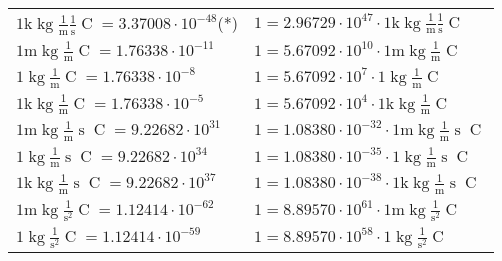 \begin{center}
\begin{longtable}{l l}
{\color{gray}$1 \bm{\mathrm{ k}}\operatorname{kg}\frac1{\operatorname{m}}\frac1{\operatorname{s}}{\operatorname{C}}{} = 3.37008\cdot10^{-48} $}\quad(*) & {\color{gray}$ 1 = 2.96729\cdot10^{47} \cdot 1 \bm{\mathrm{ k}}\operatorname{kg}\frac1{\operatorname{m}}\frac1{\operatorname{s}}{\operatorname{C}}{}$}  \\
{\color{gray}$1 \bm{\mathrm{ m}}\operatorname{kg}\frac1{\operatorname{m}}{}{\operatorname{C}}{} = 1.76338\cdot10^{-11} $}   & {\color{gray}$ 1 = 5.67092\cdot10^{10} \cdot 1 \bm{\mathrm{ m}}\operatorname{kg}\frac1{\operatorname{m}}{}{\operatorname{C}}{}$}  \\
{\color{black}$1 \bm{\mathrm{ }}\operatorname{kg}\frac1{\operatorname{m}}{}{\operatorname{C}}{} = 1.76338\cdot10^{-8} $}   & {\color{black}$ 1 = 5.67092\cdot10^{7} \cdot 1 \bm{\mathrm{ }}\operatorname{kg}\frac1{\operatorname{m}}{}{\operatorname{C}}{}$}  \\
{\color{gray}$1 \bm{\mathrm{ k}}\operatorname{kg}\frac1{\operatorname{m}}{}{\operatorname{C}}{} = 1.76338\cdot10^{-5} $}   & {\color{gray}$ 1 = 5.67092\cdot10^{4} \cdot 1 \bm{\mathrm{ k}}\operatorname{kg}\frac1{\operatorname{m}}{}{\operatorname{C}}{}$}  \\
{\color{gray}$1 \bm{\mathrm{ m}}\operatorname{kg}\frac1{\operatorname{m}}{\operatorname{s}}{\operatorname{C}}{} = 9.22682\cdot10^{31} $}   & {\color{gray}$ 1 = 1.08380\cdot10^{-32} \cdot 1 \bm{\mathrm{ m}}\operatorname{kg}\frac1{\operatorname{m}}{\operatorname{s}}{\operatorname{C}}{}$}  \\
{\color{black}$1 \bm{\mathrm{ }}\operatorname{kg}\frac1{\operatorname{m}}{\operatorname{s}}{\operatorname{C}}{} = 9.22682\cdot10^{34} $}   & {\color{black}$ 1 = 1.08380\cdot10^{-35} \cdot 1 \bm{\mathrm{ }}\operatorname{kg}\frac1{\operatorname{m}}{\operatorname{s}}{\operatorname{C}}{}$}  \\
{\color{gray}$1 \bm{\mathrm{ k}}\operatorname{kg}\frac1{\operatorname{m}}{\operatorname{s}}{\operatorname{C}}{} = 9.22682\cdot10^{37} $}   & {\color{gray}$ 1 = 1.08380\cdot10^{-38} \cdot 1 \bm{\mathrm{ k}}\operatorname{kg}\frac1{\operatorname{m}}{\operatorname{s}}{\operatorname{C}}{}$}  \\
{\color{gray}$1 \bm{\mathrm{ m}}\operatorname{kg}{}\frac1{\operatorname{s}^2}{\operatorname{C}}{} = 1.12414\cdot10^{-62} $}   & {\color{gray}$ 1 = 8.89570\cdot10^{61} \cdot 1 \bm{\mathrm{ m}}\operatorname{kg}{}\frac1{\operatorname{s}^2}{\operatorname{C}}{}$}  \\
{\color{black}$1 \bm{\mathrm{ }}\operatorname{kg}{}\frac1{\operatorname{s}^2}{\operatorname{C}}{} = 1.12414\cdot10^{-59} $}   & {\color{black}$ 1 = 8.89570\cdot10^{58} \cdot 1 \bm{\mathrm{ }}\operatorname{kg}{}\frac1{\operatorname{s}^2}{\operatorname{C}}{}$}  \\

\end{longtable}
\end{center}
